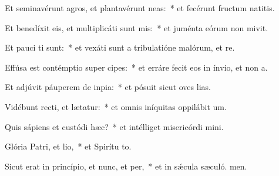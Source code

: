 \item Et seminavérunt agros, et plantavérunt neas:~* et fecérunt fructum natitis.
\item Et benedíxit eis, et multiplicáti sunt mis:~* et juménta eórum non mivit.
\item Et pauci ti sunt:~* et vexáti sunt a tribulatióne malórum, et re.
\item Effúsa est contémptio super cipes:~* et erráre fecit eos in ínvio, et non  a.
\item Et adjúvit páuperem de inpia:~* et pósuit sicut oves lias.
\item Vidébunt recti, et lætatur:~* et omnis iníquitas oppilábit  um.
\item Quis sápiens et custódi hæc?~* et intélliget misericórdi mini.
\item Glória Patri, et lio,~* et Spirítu to.
\item Sicut erat in princípio, et nunc, et per,~* et in sǽcula sæculó. men.
